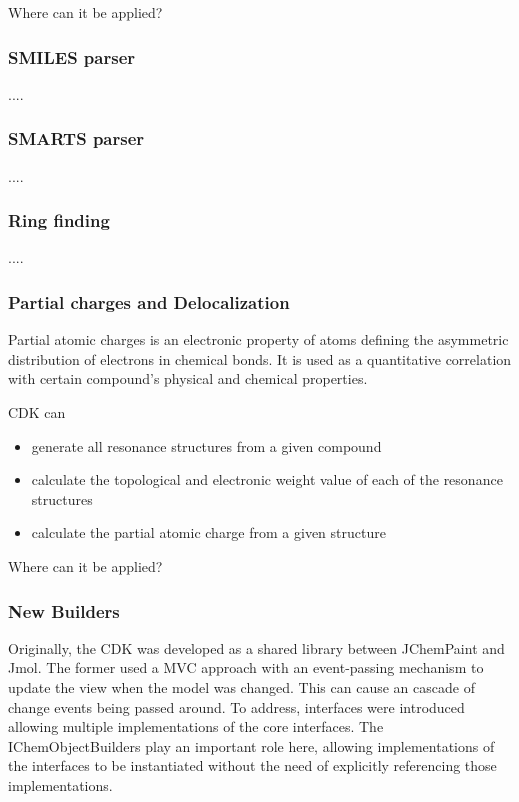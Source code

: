 \documentclass[10pt]{bmc_article}
\newenvironment{bmcformat}{\begin{raggedright}\baselineskip20pt\sloppy\setboolean{publ}{false}}{\end{raggedright}\baselineskip20pt\sloppy}
\begin{document}
\begin{bmcformat}
Where can it be applied?

  \subsubsection*{SMILES parser}
  
  ....

  \subsubsection*{SMARTS parser}
  
  ....

  \subsubsection*{Ring finding}
  
  ....

  \subsubsection*{Partial charges and Delocalization}
  
Partial atomic charges is an electronic property of atoms defining the asymmetric distribution of electrons in chemical bonds.
It is used as a quantitative correlation with certain compound's physical and chemical properties.

CDK can
\begin{itemize}
\item generate all resonance structures from a given compound 
\item calculate the topological and electronic weight value of each of the resonance structures
\item calculate the partial atomic charge from a given structure 
\end{itemize}

Where can it be applied?

  \subsubsection*{New Builders}

Originally, the CDK was developed as a shared library between JChemPaint and Jmol. The former
used a MVC approach with an event-passing mechanism to update the view when the model was
changed. This can cause an cascade of change events being passed around. To address,
interfaces were introduced allowing multiple implementations of the core interfaces.
The IChemObjectBuilders play an important role here, allowing implementations of the
interfaces to be instantiated without the need of explicitly referencing those implementations.


\end{bmcformat}
\end{document}

